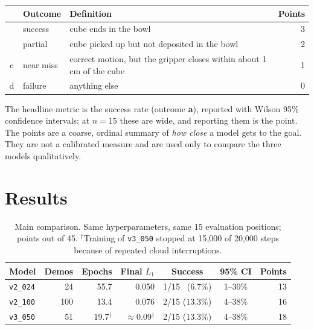 \documentclass[11pt,a4paper]{article}
\newcommand{\oa}{\cellcolor{outA}\textcolor{white}{\textbf{a}}}
\newcommand{\ob}{\cellcolor{outB}\textcolor{white}{\textbf{b}}}
\newcommand{\oc}{\cellcolor{outC}c}
\newcommand{\od}{\cellcolor{outD}\textcolor{ink2}{d}}
\begin{document}
\begin{center}
\small
\begin{tabular}{@{}cl>{\raggedright\arraybackslash}p{}r@{}}
\toprule
 & \textbf{Outcome} & \textbf{Definition} & \textbf{Points} \\
\midrule
\oa & success      & cube ends in the bowl & 3 \\
\ob & partial      & cube picked up but not deposited in the bowl & 2 \\
\oc & near miss    & correct motion, but the gripper closes within about 1\,cm of the cube & 1 \\
\od & failure      & anything else & 0 \\
\bottomrule
\end{tabular}
\end{center}

The headline metric is the success rate (outcome \textbf{a}), reported with
Wilson 95\% confidence intervals; at $n=15$ these are wide, and reporting them
is the point. The points are a coarse, ordinal summary of \emph{how close} a
model gets to the goal. They are not a calibrated measure and are used only to
compare the three models qualitatively.

\section{Results}
\label{sec:results}

\begin{table}[t]
\centering
\small
\begin{tabular}{@{}lrrrccr@{}}
\toprule
\textbf{Model} & \textbf{Demos} & \textbf{Epochs} & \textbf{Final $L_1$} & \textbf{Success} & \textbf{95\% CI} & \textbf{Points} \\
\midrule
\texttt{v2\_024} & 24  & 55.7           & 0.050                   & 1/15 \ (6.7\%) & 1--30\% & 13 \\
\texttt{v2\_100} & 100 & 13.4           & 0.076                   & 2/15 (13.3\%)  & 4--38\% & 16 \\
\texttt{v3\_050} & 51  & 19.7$^\dagger$ & $\approx$0.09$^\dagger$ & 2/15 (13.3\%)  & 4--38\% & 18 \\
\bottomrule
\end{tabular}
\caption{Main comparison. Same hyperparameters, same 15 evaluation positions;
points out of 45. $^\dagger$Training of \texttt{v3\_050} stopped at 15{,}000 of
20{,}000 steps because of repeated cloud interruptions.}
\label{tab:main}
\end{table}
\end{document}
